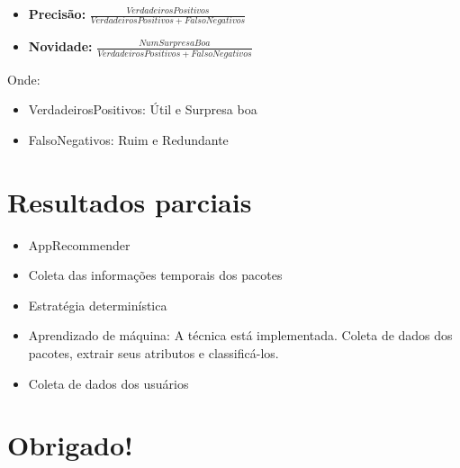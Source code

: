 \begin{frame}

\begin{itemize}
    \item \textbf{Precisão: } $\frac{VerdadeirosPositivos}{VerdadeirosPositivos
        + FalsoNegativos}$
    \item \textbf{Novidade: } $\frac{NumSurpresaBoa}{VerdadeirosPositivos +
        FalsoNegativos}$
\end{itemize}

Onde:

    \begin{itemize}
        \item VerdadeirosPositivos: Útil e Surpresa boa
        \item FalsoNegativos: Ruim e Redundante
    \end{itemize}

\end{frame}

\section{Resultados parciais} %
\label{sec:resultados_parciais}

\begin{frame}
\begin{itemize}
    \item AppRecommender
    \item Coleta das informações temporais dos pacotes
    \item Estratégia determinística
    \item Aprendizado de máquina: A técnica está implementada.
    Coleta de dados dos pacotes, extrair seus atributos e classificá-los.
    \item Coleta de dados dos usuários
\end{itemize}
\end{frame}

\section{Obrigado!}
\label{sec:obrigado}



